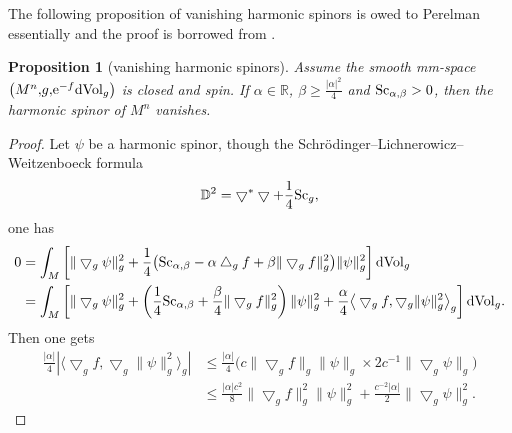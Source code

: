 \documentclass[pdftex]{sigma}
\newtheorem{Proposition}[Theorem]{Proposition}
\begin{document}
The following proposition of vanishing harmonic spinors is owed to Perelman essentially and the proof is borrowed from \cite[Proposition~1]{MR3625165}.

\begin{Proposition}[vanishing harmonic spinors]\label{vanishing}
Assume the smooth mm-space $\big(M^n{,} g{,} {\rm e}^{-f} {\rm dVol}_g\big)$ is closed and spin. If $\alpha \in \mathbb{R}$, $\beta \geq \frac{|\alpha|^2}{4}$ and ${\rm Sc}_{\alpha, \beta}>0$, then the harmonic spinor of $M^n$ vanishes.
\end{Proposition}

\begin{proof}Let $\psi$ be a harmonic spinor, though the Schr\"odinger--Lichnerowicz--Weitzenboeck formula
\begin{align*}
\mathbb{D}^2=\bigtriangledown^*\bigtriangledown + \frac{1}{4}{\rm Sc}_g,
\end{align*}
 one has
\begin{align*}
0& = \int_M \left[\|\bigtriangledown_g\psi\|^2_g + \frac{1}{4}\big({\rm Sc}_{\alpha, \beta} - \alpha \bigtriangleup_g f + \beta\|\bigtriangledown_gf\|^2_g\big)\|\psi\|^2_g \right] {\rm dVol}_g\\
& = \int_M \left[\|\bigtriangledown_g\psi\|^2_g + \left(\frac{1}{4}{\rm Sc}_{\alpha, \beta} + \frac{\beta}{4}\|\bigtriangledown_g f\|^2_g\right)\|\psi\|^2_g + \frac{\alpha}{4} \big\langle \bigtriangledown_gf, \bigtriangledown_g\|\psi\|^2_g\big\rangle_g\right] {\rm dVol}_g .
\end{align*}
Then one gets
\begin{align*}
\frac{|\alpha|}{4}|\big\langle\bigtriangledown_g f,\bigtriangledown_g\|\psi\|^2_g \big\rangle_g| & \leq\frac{|\alpha|}{4}\big(c\|\bigtriangledown_gf\|_g \|\psi\|_g \times 2c^{-1}\|\bigtriangledown_g\psi\|_g\big)\\
& \leq \frac{|\alpha| c^2}{8} \|\bigtriangledown_gf\|^2_g \|\psi\|^2_g + \frac{c^{-2}|\alpha|}{2}\|\bigtriangledown_g\psi\|^2_g.
\end{align*}


\end{proof}
\end{document}
